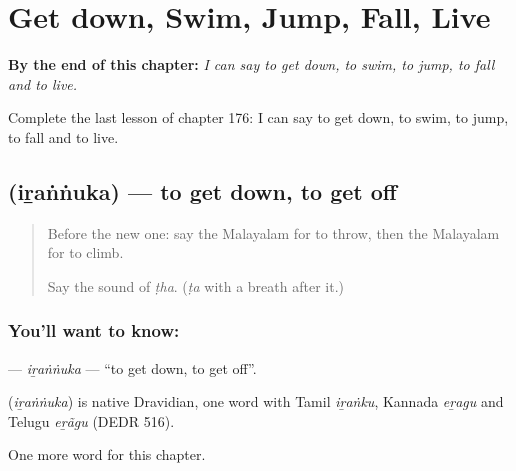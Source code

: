 
\chapter{Get down, Swim, Jump, Fall, Live}
\label{ch:ml-get-down-swim-jump-fall-live}

\begin{chapteropening}
\textbf{By the end of this chapter:} \emph{I can say to get down, to swim, to jump, to fall and to live.}

Complete the last lesson of chapter 176: I can say to get down, to swim, to jump, to fall and to live.
\end{chapteropening}

\section[\texorpdfstring{\ml{ഇറങ്ങുക} (iṟaṅṅuka)}{ഇറങ്ങുക (iṟaṅṅuka)}]{ (iṟaṅṅuka) — to get down, to get off}

\label{lesson:ML-C176-irannuka}



\begin{quote}
Before the new one: say the Malayalam for to throw, then the Malayalam for to climb.

Say the sound of \emph{ṭha}. (\emph{ṭa} with a breath after it.)
\end{quote}

\subsection*{You'll want to know: }
\textbf{} — \emph{iṟaṅṅuka} — \textquotedblleft{}to get down, to get off\textquotedblright{}.

\begin{cousinweb}
\textbf{} (\emph{iṟaṅṅuka}) is native Dravidian, one word with Tamil \emph{iṟaṅku}, Kannada \emph{eṟagu} and Telugu \emph{eṟãgu} (DEDR 516).
\end{cousinweb}

\begin{grammarlens}[title={What you've built}]
One more word for this chapter.
\end{grammarlens}

